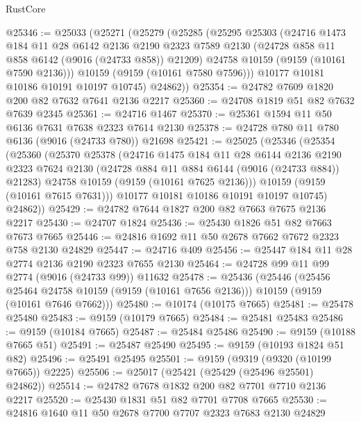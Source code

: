 \begin{lexlean}{RustCore}
\begin{coremodule}
@25346 := @25033
    (@25271
      (@25279
        (@25285
          (@25295
            @25303
            (@24716
              @1473
              @184
              @11
              @28
              @6142
              @2136
              @2190
              @2323
              @7589
              @2130
              (@24728 @858 @11 @858 @6142 (@9016 (@24733 @858)) @21209)
              @24758
              @10159
              (@9159 (@10161 @7590 @2136)))
            @10159
            (@9159 (@10161 @7580 @7596)))
          @10177
          @10181
          @10186
          @10191
          @10197
          @10745)
        @24862))
@25354 := @24782 @7609 @1820 @200 @82 @7632 @7641 @2136 @2217
@25360 := @24708 @1819 @51 @82 @7632 @7639 @2345
@25361 := @24716 @1467
@25370 := @25361 @1594 @11 @50 @6136 @7631 @7638 @2323 @7614 @2130
@25378 := @24728 @780 @11 @780 @6136 (@9016 (@24733 @780)) @21698
@25421 := @25025
    (@25346
      (@25354
        (@25360
          (@25370
            @25378
            (@24716
              @1475
              @184
              @11
              @28
              @6144
              @2136
              @2190
              @2323
              @7624
              @2130
              (@24728 @884 @11 @884 @6144 (@9016 (@24733 @884)) @21283)
              @24758
              @10159
              (@9159 (@10161 @7625 @2136)))
            @10159
            (@9159 (@10161 @7615 @7631)))
          @10177
          @10181
          @10186
          @10191
          @10197
          @10745)
        @24862))
@25429 := @24782 @7644 @1827 @200 @82 @7663 @7675 @2136 @2217
@25430 := @24707 @1824
@25436 := @25430 @1826 @51 @82 @7663 @7673 @7665
@25446 := @24816 @1692 @11 @50 @2678 @7662 @7672 @2323 @758 @2130 @24829
@25447 := @24716 @409
@25456 := @25447 @184 @11 @28 @2774 @2136 @2190 @2323 @7655 @2130
@25464 := @24728 @99 @11 @99 @2774 (@9016 (@24733 @99)) @11632
@25478 := @25436
    (@25446
      (@25456 @25464 @24758 @10159 (@9159 (@10161 @7656 @2136)))
      @10159
      (@9159 (@10161 @7646 @7662)))
@25480 := @10174 (@10175 @7665)
@25481 := @25478 @25480
@25483 := @9159 (@10179 @7665)
@25484 := @25481 @25483
@25486 := @9159 (@10184 @7665)
@25487 := @25484 @25486
@25490 := @9159 (@10188 @7665 @51)
@25491 := @25487 @25490
@25495 := @9159 (@10193 @1824 @51 @82)
@25496 := @25491 @25495
@25501 := @9159 (@9319 (@9320 (@10199 @7665)) @2225)
@25506 := @25017 (@25421 (@25429 (@25496 @25501) @24862))
@25514 := @24782 @7678 @1832 @200 @82 @7701 @7710 @2136 @2217
@25520 := @25430 @1831 @51 @82 @7701 @7708 @7665
@25530 := @24816 @1640 @11 @50 @2678 @7700 @7707 @2323 @7683 @2130 @24829

\end{coremodule}
\end{lexlean}
